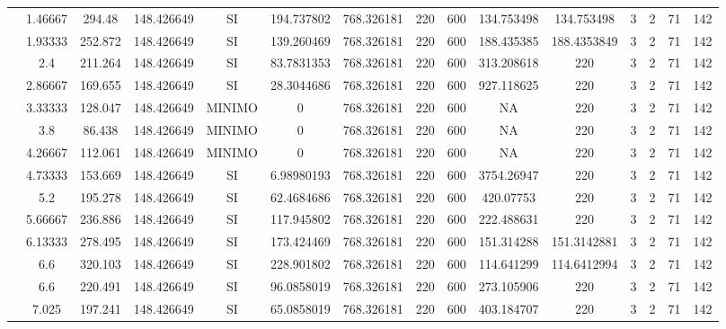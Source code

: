 \begin{table}[H]
{\begin{tabular}{|c|c|c|c|c|c|c|c|c|c|c|c|c|c|c|}
\cline{2-15}    & 1.46667 & 294.48 & 148.426649 & SI  & 194.737802 & 768.326181 & 220 & 600 & 134.753498 & 134.753498 & 3   & 2   & 71  & 142 \bigstrut\\
\cline{2-15}    & 1.93333 & 252.872 & 148.426649 & SI  & 139.260469 & 768.326181 & 220 & 600 & 188.435385 & 188.4353849 & 3   & 2   & 71  & 142 \bigstrut\\
\cline{2-15}    & 2.4 & 211.264 & 148.426649 & SI  & 83.7831353 & 768.326181 & 220 & 600 & 313.208618 & 220 & 3   & 2   & 71  & 142 \bigstrut\\
\cline{2-15}    & 2.86667 & 169.655 & 148.426649 & SI  & 28.3044686 & 768.326181 & 220 & 600 & 927.118625 & 220 & 3   & 2   & 71  & 142 \bigstrut\\
\cline{2-15}    & 3.33333 & 128.047 & 148.426649 & MINIMO & 0   & 768.326181 & 220 & 600 & NA  & 220 & 3   & 2   & 71  & 142 \bigstrut\\
\cline{2-15}    & 3.8 & 86.438 & 148.426649 & MINIMO & 0   & 768.326181 & 220 & 600 & NA  & 220 & 3   & 2   & 71  & 142 \bigstrut\\
\cline{2-15}    & 4.26667 & 112.061 & 148.426649 & MINIMO & 0   & 768.326181 & 220 & 600 & NA  & 220 & 3   & 2   & 71  & 142 \bigstrut\\
\cline{2-15}    & 4.73333 & 153.669 & 148.426649 & SI  & 6.98980193 & 768.326181 & 220 & 600 & 3754.26947 & 220 & 3   & 2   & 71  & 142 \bigstrut\\
\cline{2-15}    & 5.2 & 195.278 & 148.426649 & SI  & 62.4684686 & 768.326181 & 220 & 600 & 420.07753 & 220 & 3   & 2   & 71  & 142 \bigstrut\\
\cline{2-15}    & 5.66667 & 236.886 & 148.426649 & SI  & 117.945802 & 768.326181 & 220 & 600 & 222.488631 & 220 & 3   & 2   & 71  & 142 \bigstrut\\
\cline{2-15}    & 6.13333 & 278.495 & 148.426649 & SI  & 173.424469 & 768.326181 & 220 & 600 & 151.314288 & 151.3142881 & 3   & 2   & 71  & 142 \bigstrut\\
\cline{2-15}    & 6.6 & 320.103 & 148.426649 & SI  & 228.901802 & 768.326181 & 220 & 600 & 114.641299 & 114.6412994 & 3   & 2   & 71  & 142 \bigstrut\\
\cline{2-15}    & 6.6 & 220.491 & 148.426649 & SI  & 96.0858019 & 768.326181 & 220 & 600 & 273.105906 & 220 & 3   & 2   & 71  & 142 \bigstrut\\
\cline{2-15}    & 7.025 & 197.241 & 148.426649 & SI  & 65.0858019 & 768.326181 & 220 & 600 & 403.184707 & 220 & 3   & 2   & 71  & 142 \bigstrut\\

\end{tabular}}
\end{table}

